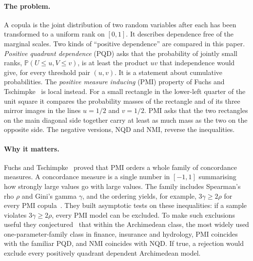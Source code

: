 \documentclass[11pt,a4paper]{article}
\theoremstyle{remark}
\newcommand{\PP}{\mathbb{P}}
\begin{document}
\paragraph{The problem.} A copula is the joint distribution of two random variables after each has been transformed to a uniform rank on $[0,1]$. It describes dependence free of the marginal scales. Two kinds of ``positive dependence'' are compared in this paper. \emph{Positive quadrant dependence} (PQD) asks that the probability of jointly small ranks, $\PP(U\leq u,V\leq v)$, is at least the product $uv$ that independence would give, for every threshold pair $(u,v)$. It is a statement about cumulative probabilities. The \emph{positive measure inducing} (PMI) property of Fuchs and Tschimpke~\cite{FT} is local instead. For a small rectangle in the lower-left quarter of the unit square it compares the probability masses of the rectangle and of its three mirror images in the lines $u=1/2$ and $v=1/2$. PMI asks that the two rectangles on the main diagonal side together carry at least as much mass as the two on the opposite side. The negative versions, NQD and NMI, reverse the inequalities.

\paragraph{Why it matters.} Fuchs and Tschimpke~\cite[Theorem~1]{FT} proved that PMI orders a whole family of concordance measures. A concordance measure is a single number in $[-1,1]$ summarising how strongly large values go with large values. The family includes Spearman's rho $\rho$ and Gini's gamma $\gamma$, and the ordering yields, for example, $3\gamma\geq2\rho$ for every PMI copula~\cite[Corollary~1]{FT}. They built asymptotic tests on these inequalities: if a sample violates $3\gamma\geq2\rho$, every PMI model can be excluded. To make such exclusions useful they conjectured~\cite[Conjecture~1]{FT} that within the Archimedean class, the most widely used one-parameter-family class in finance, insurance and hydrology, PMI coincides with the familiar PQD, and NMI coincides with NQD. If true, a rejection would exclude every positively quadrant dependent Archimedean model.
\end{document}

